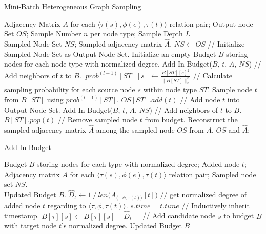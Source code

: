 \documentclass[sigconf]{acmart}
\theoremstyle{definition}
\begin{document}
{\begin{algorithm}[tb] 
\caption{Mini-Batch Heterogeneous Graph Sampling} 
\label{alg:sample} 
\begin{algorithmic}[1] 
\REQUIRE
Adjacency Matrix $A$ for each $\langle \tau(s), \phi(e), \tau(t) \rangle$ relation pair; Output node Set $OS$; Sample Number $n$ per node type; Sample Depth $L$\\
\ENSURE
Sampled Node Set $NS$; Sampled adjacency matrix $\hat{A}$.
\STATE  $NS \gets OS$ // Initialize Sampled Node Set as Output Node Set.
\STATE  Initialize an empty Budget $B$ storing nodes for each node type with normalized degree. 
    \STATE  Add-In-Budget($B$, $t$, $A$, $NS$) // Add neighbors of $t$ to $B$.
\ENDFOR
{}
        \STATE  $\ prob^{(l-1)}[ST][s] \gets \frac{B[ST][s]^2}{\|B[ST]\|_2^2}$ // Calculate sampling probability for each source node $s$ within node type $ST$. \label{line:prob}
         \label{line:samp}
            \STATE  Sample node $t$ from $B[ST]$ using $prob^{(l-1)}[ST]$.
            \STATE  $OS[ST].add(t)$ // Add node $t$ into Output Node Set.
            \STATE  Add-In-Budget($B$, $t$, $A$, $NS$) // Add neighbors of $t$ to $B$.
            \STATE  $B[ST].pop(t)$ // Remove sampled node $t$ from budget. \label{line:end}
        \ENDFOR
    \ENDFOR
\ENDFOR
\STATE  Reconstruct the sampled adjacency matrix $\hat{A}$ among the sampled node $OS$ from $A$.
\RETURN $OS$ and $\hat{A}$; 
\end{algorithmic} 
\end{algorithm}


 


\begin{algorithm}[tb] 
\caption{Add-In-Budget} 
\label{alg:budget} 
\begin{algorithmic}[1] 
\REQUIRE
Budget $B$ storing nodes for each type with normalized degree; Added node $t$; Adjacency matrix $A$ for each $\langle \tau(s), \phi(e), \tau(t) \rangle$ relation pair; Sampled node set $NS$.\\
\ENSURE
Updated Budget $B$.
\STATE  $\hat{D}_t \gets 1 \ /\ len\Big(A_{\langle \tau, \phi, \tau(t) \rangle}[t]\Big)$ // get normalized degree of added node $t$ regarding to $\langle \tau, \phi, \tau(t) \rangle$.
             \label{line:check}
                     \STATE  $s.time = t.time$ // Inductively inherit timestamp. \label{line:time}
                 \ENDIF
                \STATE  $B[\tau][s] \gets B[\tau][s] + \hat{D}_t$\ \ \ // Add candidate node $s$ to budget $B$ with target node $t$'s normalized degree. \label{line:update}
            \ENDIF
        \ENDFOR  
    \ENDFOR
\RETURN Updated Budget $B$
\end{algorithmic} 
\end{algorithm}


}
\end{document}
